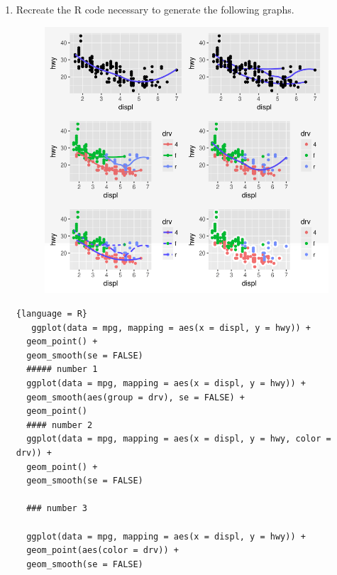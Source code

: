 \documentclass[11pt]{article}
\begin{document}
\begin{enumerate}
\begin{lstlisting}{language = R}
ggplot() + 
  geom_point(data = mpg, mapping =
  aes(x = displ, y = hwy)) + 
  geom_smooth(data = mpg, mapping =
  aes(x = displ, y = hwy))

\end{lstlisting}


\textbf{
I am not sure because they use the same data, It should produce the same graph, but there is a lot details that might be missed in the format of the code }
         
         
   
      
  \item Recreate the R code necessary to generate the following graphs.    
  \begin{figure}[h!]
\includegraphics[scale = .5]{recreategraphs.png}
\centering
\end{figure}
    
  \begin{lstlisting}{language = R}
   ggplot(data = mpg, mapping = aes(x = displ, y = hwy)) + 
  geom_point() + 
  geom_smooth(se = FALSE)
  ##### number 1
  ggplot(data = mpg, mapping = aes(x = displ, y = hwy)) + 
  geom_smooth(aes(group = drv), se = FALSE) +
  geom_point()
  #### number 2
  ggplot(data = mpg, mapping = aes(x = displ, y = hwy, color = drv)) + 
  geom_point() + 
  geom_smooth(se = FALSE)
  
  ### number 3
  
  ggplot(data = mpg, mapping = aes(x = displ, y = hwy)) + 
  geom_point(aes(color = drv)) + 
  geom_smooth(se = FALSE)
  

\end{lstlisting}
\end{enumerate}
\end{document}
